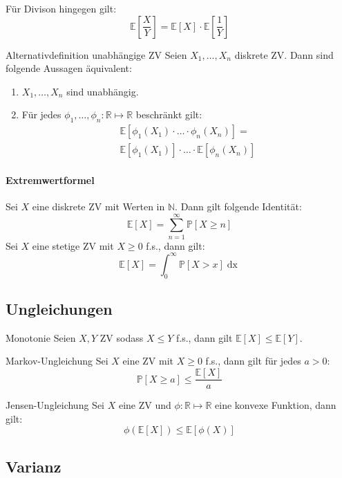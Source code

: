 \documentclass[a4paper,10pt]{article}
\def\R{\mathbb{R}}
\def\P{\mathbb{P}}
\def\E{\mathbb{E}}
\begin{document}
Für Divison hingegen gilt:
\[\E[\frac{X}{Y}] = \E[X] \cdot \E[\frac{1}{Y}]\]

\begin{subbox}{Alternativdefinition unabhängige ZV}
	Seien \(X_1, \ldots, X_n\) diskrete ZV. Dann sind folgende Aussagen äquivalent:
	\begin{enumerate}
		\item \(X_1, \ldots, X_n\) sind unabhängig.
		\item Für jedes \(\phi_1, \ldots, \phi_n: \R \mapsto \R\) beschränkt gilt:
        \begin{multline*}
            \E[\phi_1(X_1)\cdot\ldots\cdot\phi_n(X_n)] =\\
            \E[\phi_1(X_1)] \cdot\ldots\cdot \E[\phi_n(X_n)]
        \end{multline*}
	\end{enumerate}
\end{subbox}

\paragraph{Extremwertformel} Sei \(X\) eine diskrete ZV mit Werten in \(\mathbb{N}\). Dann gilt folgende Identität:
\[\E[X] = \sum_{n=1}^\infty \P[X\ge n]\]
Sei \(X\) eine stetige ZV mit \(X \ge 0\) f.s., dann gilt:
\[\E[X] = \int_0^\infty \P[X > x] \mathop{dx}\]


\subsection{Ungleichungen}

\begin{subbox}{Monotonie}
	Seien \(X, Y\) ZV sodass \(X \le Y\) f.s., dann gilt \(\E[X] \le \E[Y]\).
\end{subbox}

\begin{mainbox}{Markov-Ungleichung}
	Sei \(X\) eine ZV mit \(X \ge 0\) f.s., dann gilt für jedes \(a > 0\):
	\[\P[X\ge a] \le \frac{\E[X]}{a}\]
\end{mainbox}

\begin{subbox}{Jensen-Ungleichung}
	Sei \(X\) eine ZV und \(\phi : \R \mapsto \R\) eine konvexe Funktion, dann gilt:
	\[\phi(\E[X]) \le \E[\phi(X)]\]
\end{subbox}


\subsection{Varianz}
\end{document}
